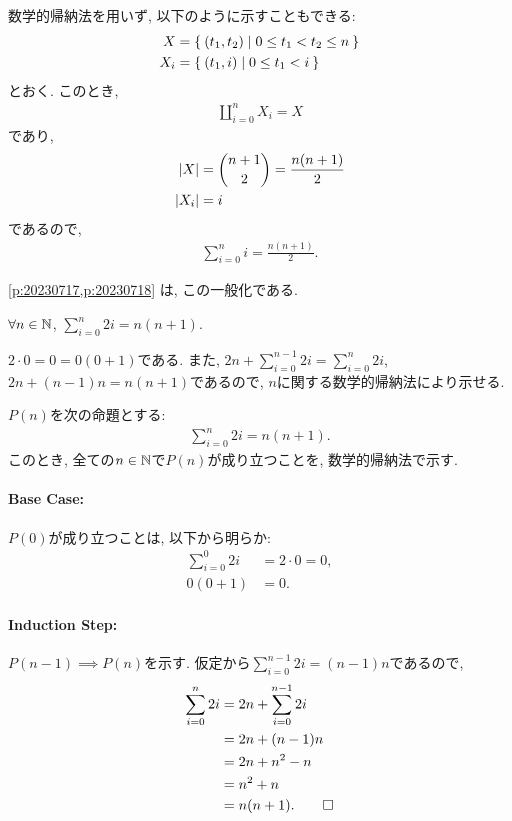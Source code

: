\begin{rem}
  数学的帰納法を用いず, 以下のように示すこともできる:
  \begin{align*}
    X&=\Set{(t_1,t_2)|0\leq t_1<t_2 \leq  n}\\
    X_i&=\Set{(t_1,i)|0\leq t_1<i }
  \end{align*}
  とおく. このとき,
  \begin{align*}
    \coprod_{i=0}^{n}X_i = X
  \end{align*}
  であり,
  \begin{align*}
    \left|X\right|&=\binom{n+1}{2}=\frac{n(n+1)}{2}\\
    \left|X_i\right|&=i
  \end{align*}
  であるので,
  \begin{align*}
    \sum_{i=0}^{n}i=\frac{n(n+1)}{2}.
  \end{align*}
\end{rem}

\begin{rem}
\cref{p:20230717,p:20230718}
は,
この一般化である.
\end{rem}

\begin{prop}
  \label{p:20230703}
  $\forall n\in\mathbb{N}$,
  $\sum_{i=0}^{n}2i=n(n+1).$
\end{prop}
\begin{proof**}
  $2\cdot 0=0=0(0+1)$である.
  また,
  $2n+\sum_{i=0}^{n-1}2i=\sum_{i=0}^{n}2i$,
  $2n+(n-1)n=n(n+1)$であるので,
  $n$に関する数学的帰納法により示せる.
\end{proof**}


\begin{proof*}
  $P(n)$を次の命題とする:
  \begin{align*}
    \sum_{i=0}^{n}2i=n(n+1).
  \end{align*}
  このとき, 全ての$n\in\mathbb{N}$で$P(n)$が成り立つことを,
  数学的帰納法で示す.

  \paragraph{Base Case:}
  $P(0)$が成り立つことは, 以下から明らか:
  \begin{align*}
    \sum_{i=0}^{0}2i&=2\cdot 0=0,\\
    0(0+1)&=0.
  \end{align*}

  \paragraph{Induction Step:}
  $P(n-1)\implies P(n)$を示す.
  仮定から$\sum_{i=0}^{n-1}2i=(n-1)n$であるので,
  \begin{align*}
    \sum_{i=0}^{n}2i&=2n+\sum_{i=0}^{n-1}2i\\
    &=2n+(n-1)n\\
    &=2n+n^2-n\\
    &=n^2+n\\
    &=n(n+1).
    \qedhere
  \end{align*}
\end{proof*}

